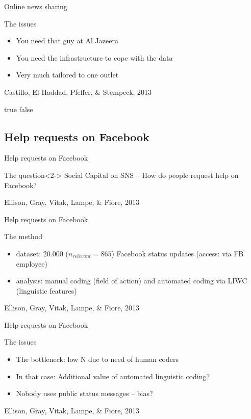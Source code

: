 \documentclass{beamer}
\begin{document}
\begin{frame}{Online news sharing}
\begin{block}{The issues}
\begin{itemize}
\item You need that guy at Al Jazeera
\item You need the infrastructure to cope with the data
\item Very much tailored to one outlet
\end{itemize}
\end{block}
\footnotesize{Castillo, El-Haddad, Pfeffer, \& Stempeck, 2013}
\end{frame}

\if true false
\subsection{Help requests on Facebook}
\begin{frame}{Help requests on Facebook}
\begin{block}{The question}<2->
Social Capital on SNS -- How do people request help on Facebook?
\end{block}
\footnotesize{Ellison, Gray, Vitak, Lampe, \& Fiore, 2013}
\end{frame}

\begin{frame}{Help requests on Facebook}
\begin{block}{The method}
\begin{itemize}
\item dataset: 20.000 ($n_{relevant} = 865$) Facebook status updates (access: via FB employee)
\item analysis: manual coding (field of action) and automated coding via LIWC (linguistic features)
\end{itemize}
\end{block}
\footnotesize{Ellison, Gray, Vitak, Lampe, \& Fiore, 2013}
\end{frame}

\begin{frame}{Help requests on Facebook}
\begin{block}{The issues}
\begin{itemize}
\item<2-> The bottleneck: low N due to need of human coders 
\item<3-> In that case: Additional value of automated linguistic coding?
\item<4-> Nobody uses public status messages -- bias?
\end{itemize}
\end{block}
\footnotesize{Ellison, Gray, Vitak, Lampe, \& Fiore, 2013}
\end{frame}
\fi
\end{document}
